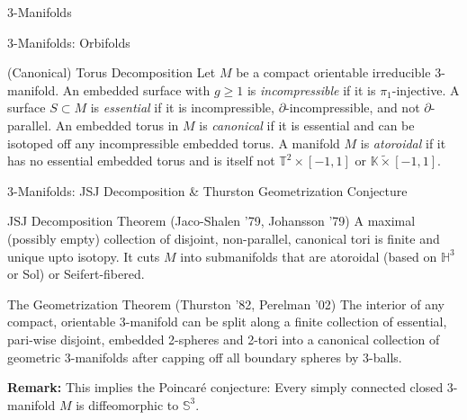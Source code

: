 \documentclass{beamer}
\begin{document}
\begin{section}{3-Manifolds}
\begin{frame}{3-Manifolds: Orbifolds}
\end{frame}{}
\fi
\begin{frame}{(Canonical) Torus Decomposition}
    Let $M$ be a compact orientable irreducible 3-manifold.
    \newline
    \newline
    An embedded surface with $g \geq 1$ is \textit{incompressible} if it is $\pi_1$-injective. 
    \newline
    \newline
    A surface $S\subset M$ is \textit{essential} if it is incompressible, $\partial$-incompressible, and not $\partial$-parallel.
    \newline
    \newline
    An embedded torus in $M$ is \textit{canonical} if it is essential and can be isotoped off any incompressible embedded torus. 
    \newline
    \newline
    A manifold $M$ is \textit{atoroidal} if it has no essential embedded torus and is itself not $\mathbb{T}^2\times [-1,1]$ or $\mathbb{K}\tilde{\times} [-1,1]$. 
\end{frame}{}




\begin{frame}{3-Manifolds: JSJ Decomposition \& Thurston Geometrization Conjecture}
    \begin{block}{JSJ Decomposition Theorem (Jaco-Shalen '79, Johansson '79)}
        A maximal (possibly empty) collection of disjoint, non-parallel, canonical tori is finite and unique upto isotopy. It cuts $M$ into submanifolds that are atoroidal (based on $\mathbb{H}^3$ or Sol) or Seifert-fibered.
    \end{block}
    
    \begin{block}{The Geometrization Theorem (Thurston '82, Perelman '02)}
        The interior of any compact, orientable 3-manifold can be split along a finite collection of essential, pari-wise disjoint, embedded 2-spheres and 2-tori into a canonical collection of geometric 3-manifolds after capping off all boundary spheres by 3-balls.
    \end{block}
    \textbf{Remark:} This implies the Poincar\'e conjecture: Every simply connected closed 3-manifold $M$ is diffeomorphic to $\mathbb{S}^3$. 

\end{frame}


\end{section}
\end{document}
